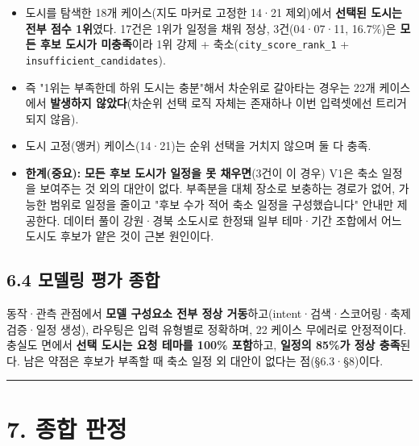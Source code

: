 \documentclass[11pt,a4paper]{article}
\newcommand{\DocNeedspace}[1]{\par\ifdim\dimexpr\pagegoal-\pagetotal\relax<#1\newpage\fi}
\providecommand{\tightlist}{\setlength{\itemsep}{0pt}\setlength{\parskip}{0pt}}
\begin{document}
\begin{itemize}
\tightlist
\item
  도시를 탐색한 18개 케이스(지도 마커로 고정한 14·21 제외)에서 \textbf{선택된 도시는 전부 점수 1위}였다. 17건은 1위가 일정을 채워 정상, 3건(04·07·11, 16.7\%)은 \textbf{모든 후보 도시가 미충족}이라 1위 강제 + 축소(\texttt{city\_\allowbreak{}score\_\allowbreak{}rank\_\allowbreak{}1} + \texttt{insufficient\_\allowbreak{}candidates}).
\item
  즉 "1위는 부족한데 하위 도시는 충분"해서 차순위로 갈아타는 경우는 22개 케이스에서 \textbf{발생하지 않았다}(차순위 선택 로직 자체는 존재하나 이번 입력셋에선 트리거되지 않음).
\item
  도시 고정(앵커) 케이스(14·21)는 순위 선택을 거치지 않으며 둘 다 충족.
\item
  \textbf{한계(중요):} \textbf{모든 후보 도시가 일정을 못 채우면}(3건이 이 경우) V1은 축소 일정을 보여주는 것 외의 대안이 없다. 부족분을 대체 장소로 보충하는 경로가 없어, 가능한 범위로 일정을 줄이고 "후보 수가 적어 축소 일정을 구성했습니다" 안내만 제공한다. 데이터 풀이 강원·경북 소도시로 한정돼 일부 테마·기간 조합에서 어느 도시도 후보가 얕은 것이 근본 원인이다.
\end{itemize}

\DocNeedspace{6\baselineskip}
\subsection*{6.4 모델링 평가 종합}

동작·관측 관점에서 \textbf{모델 구성요소 전부 정상 거동}하고(intent·검색·스코어링·축제 검증·일정 생성), 라우팅은 입력 유형별로 정확하며, 22 케이스 무에러로 안정적이다. 충실도 면에서 \textbf{선택 도시는 요청 테마를 100\% 포함}하고, \textbf{일정의 85\%가 정상 충족}된다. 남은 약점은 후보가 부족할 때 축소 일정 외 대안이 없다는 점(§6.3·§8)이다.

\begin{center}\rule{0.5\linewidth}{0.5pt}\end{center}

\newpage
\DocNeedspace{8\baselineskip}
\section*{7. 종합 판정}
\end{document}
